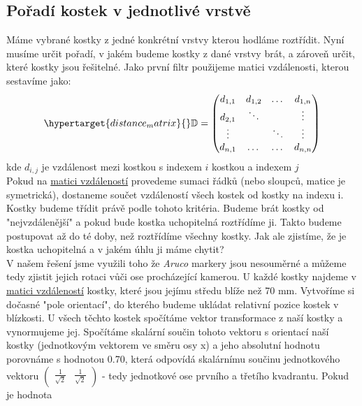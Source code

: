 \documentclass[journal,twoside,web]{ieeecolor}
\begin{document}
\hypertarget{layer_sort}{\subsection{Pořadí kostek v jednotlivé vrstvě}}
Máme vybrané kostky z jedné konkrétní vrstvy kterou hodláme roztřídit. Nyní musíme určit pořadí, v jakém budeme kostky z dané vrstvy brát, a zároveň určit,
které kostky jsou řešitelné. Jako první filtr použijeme matici vzdálenosti, kterou sestavíme jako:\\
\begin{equation}
    \hypertarget{distance_matrix}{}
    \mathbb{D} = \begin{pmatrix}d_{1,1} & d_{1,2} & \dots  & d_{1, n} \\
               d_{2,1} & \ddots  &        & \vdots   \\
               \vdots  &         & \ddots & \vdots   \\
               d_{n,1} & \dots   & \dots  & d_{n, n} \\\end{pmatrix}
\end{equation}
kde $d_{i, j}$ je vzdálenost mezi kostkou s indexem $i$ kostkou a indexem $j$\\
Pokud na \hyperlink{distance_matrix}{matici vzdáleností} provedeme sumaci řádků (nebo sloupců, matice je symetrická), dostaneme součet vzdáleností všech kostek
od kostky na indexu i. Kostky budeme třídit právě podle tohoto kritéria. Budeme brát kostky od "nejvzdálenější" a pokud bude kostka uchopitelná roztřídíme ji. Takto budeme
postupovat až do té doby, než roztřídíme všechny kostky. Jak ale zjistíme, že je kostka uchopitelná a v jakém úhlu ji máme chytit? \\ %
V našem řešení jsme využili toho že \textit{Aruco} markery jsou nesouměrné a můžeme tedy zjistit jejich rotaci vůči ose procházející kamerou.
U každé kostky najdeme v \hyperlink{distance_matrix}{matici vzdáleností} kostky, které jsou jejímu středu blíže než 70 mm.
Vytvoříme si dočasné "pole orientací", do kterého budeme ukládat relativní pozice kostek v blízkosti.
U všech těchto kostek spočítáme vektor transformace z naší kostky a vynormujeme jej. Spočítáme skalární součin tohoto vektoru
s orientací naší kostky (jednotkovým vektorem ve směru osy x) a jeho absolutní hodnotu porovnáme s hodnotou 0.70, která odpovídá skalárnímu součinu
jednotkového vektoru $\begin{pmatrix}\frac{1}{\sqrt{2}}&\frac{1}{\sqrt{2}}\end{pmatrix}$ - tedy jednotkové ose prvního a třetího kvadrantu. Pokud je hodnota
\end{document}
